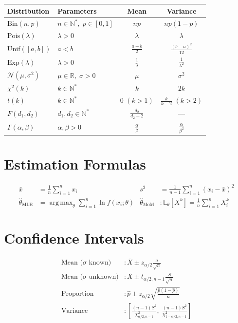 \documentclass[12pt,a4paper,twoside]{book}
\theoremstyle{definition}
\theoremstyle{plain}
\theoremstyle{remark}
\newcommand{\E}{\mathbb{E}}
\newcommand{\R}{\mathbb{R}}
\newcommand{\N}{\mathbb{N}}
\newcommand{\phat}{\hat{p}}
\newcommand{\thetahat}{\hat{\theta}}
\DeclareMathOperator*{\argmax}{arg\,max}
\begin{document}
\begin{center}
\begin{tabular}{llcc}
\toprule
\textbf{Distribution} & \textbf{Parameters} & \textbf{Mean} & \textbf{Variance} \\
\midrule
$\mathrm{Bin}(n,p)$ & $n\in\N^*,\; p\in[0,1]$ & $np$ & $np(1-p)$ \\
$\mathrm{Pois}(\lambda)$ & $\lambda>0$ & $\lambda$ & $\lambda$ \\
$\mathrm{Unif}([a,b])$ & $a<b$ & $\frac{a+b}{2}$ & $\frac{(b-a)^2}{12}$ \\
$\mathrm{Exp}(\lambda)$ & $\lambda>0$ & $\frac{1}{\lambda}$ & $\frac{1}{\lambda^2}$ \\
$\mathcal{N}(\mu,\sigma^2)$ & $\mu\in\R,\;\sigma>0$ & $\mu$ & $\sigma^2$ \\
$\chi^2(k)$ & $k\in\N^*$ & $k$ & $2k$ \\
$t(k)$ & $k\in\N^*$ & $0$ $(k>1)$ & $\frac{k}{k-2}$ $(k>2)$ \\
$F(d_1,d_2)$ & $d_1,d_2\in\N^*$ & $\frac{d_2}{d_2-2}$ & --- \\
$\Gamma(\alpha,\beta)$ & $\alpha,\beta>0$ & $\frac{\alpha}{\beta}$ & $\frac{\alpha}{\beta^2}$ \\
\bottomrule
\end{tabular}
\end{center}

\section{Estimation Formulas}
\begin{align}
\bar{x} &= \frac{1}{n}\sum_{i=1}^n x_i &
s^2 &= \frac{1}{n-1}\sum_{i=1}^n (x_i-\bar{x})^2 \\
\thetahat_{\text{MLE}} &= \argmax_\theta \sum_{i=1}^n \ln f(x_i;\theta) &
\thetahat_{\text{MoM}} &: \E_\theta[X^k] = \frac{1}{n}\sum_{i=1}^n X_i^k
\end{align}

\section{Confidence Intervals}
\begin{align}
\text{Mean (}\sigma\text{ known)} &: \bar{X} \pm z_{\alpha/2}\frac{\sigma}{\sqrt{n}} \\
\text{Mean (}\sigma\text{ unknown)} &: \bar{X} \pm t_{\alpha/2,n-1}\frac{S}{\sqrt{n}} \\
\text{Proportion} &: \phat \pm z_{\alpha/2}\sqrt{\frac{\phat(1-\phat)}{n}} \\
\text{Variance} &: \left[\frac{(n-1)S^2}{\chi^2_{\alpha/2,n-1}},\;\frac{(n-1)S^2}{\chi^2_{1-\alpha/2,n-1}}\right]
\end{align}
\end{document}
